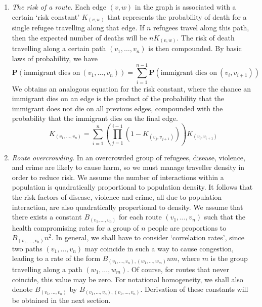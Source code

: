 \documentclass{article}
\begin{document}
\begin{enumerate}
    \item {\it The risk of a route}. Each edge $(v,w)$ in the graph is associated with a certain `risk constant' $K_{(v,w)}$ that represents the probability of death for a single refugee travelling along that edge. If $n$ refugees travel along this path, then the expected number of deaths will be $n K_{(v,w)}$. The risk of death travelling along a certain path $(v_1, \dots, v_n)$ is then compounded. By basic laws of probability, we have
    \[ \mathbf{P}(\text{immigrant dies on}\ (v_1, \dots, v_n)) = \sum_{i = 1}^{n-1} \mathbf{P}(\text{immigrant dies on}\ (v_i, v_{i+1})) \]
    We obtains an analogous equation for the risk constant, where the chance an immigrant dies on an edge is the product of the probability that the immigrant does not die on all previous edges, compounded with the probability that the immigrant dies on the final edge.
    \[ K_{(v_1, \dots, v_n)} = \sum_{i = 1}^n \left( \prod_{j = 1}^{i-1} \left(1 - K_{(v_j,v_{j+1})} \right) \right) K_{(v_i, v_{i+1})} \]

    \item {\it Route overcrowding}. In an overcrowded group of refugees, disease, violence, and crime are likely to cause harm, so we must manage traveller density in order to reduce risk. We assume the number of interactions within a population is quadratically proportional to population density. It follows that the risk factors of disease, violence and crime, all due to population interaction, are also quadratically propertional to density. We assume that there exists a constant $B_{(v_1, \dots, v_n)}$ for each route $(v_1, \dots, v_n)$ such that the health compromising rates for a group of $n$ people are proportions to $B_{(v_1, \dots, v_n)} n^2$. In general, we shall have to consider `correlation rates', since two paths $(v_1, \dots, v_n)$ may coincide in such a way to cause congestion, leading to a rate of the form $B_{(v_1, \dots, v_n), (w_1, \dots, w_m)} n m$, where $m$ is the group travelling along a path $(w_1, \dots, w_m)$. Of course, for routes that never coincide, this value may be zero. For notational homogeneity, we shall also denote $B_{(v_1, \dots, v_n)}$ by $B_{(v_1, \dots, v_n), (v_1, \dots, v_n)}$. Derivation of these constants will be obtained in the next section.
\end{enumerate}
\end{document}
